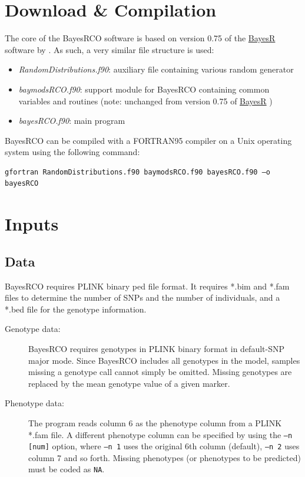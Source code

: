\documentclass{ol-softwaremanual}
\begin{document}
\section{Download \& Compilation}

The core of the BayesRCO software is based on version 0.75 of the \href{https://github.com/syntheke/bayesR/tree/master/old}{BayesR} software by \citet{moser_simultaneous_2015}. As such, a very similar file structure is used: \\
\begin{itemize}
    \item {\it RandomDistributions.f90}: auxiliary file containing various random generator %
 \item {\it baymodsRCO.f90}: support module for BayesRCO containing common variables and routines (note: unchanged from version 0.75 of \href{https://github.com/syntheke/bayesR/tree/master/old}{BayesR} 
)
\item {\it bayesRCO.f90}: main program 
\end{itemize}
BayesRCO can be compiled with a FORTRAN95 compiler on a Unix operating system using the following command:
\noindent\begin{verbatim}
gfortran RandomDistributions.f90 baymodsRCO.f90 bayesRCO.f90 –o bayesRCO
\end{verbatim}

\section{Inputs}

\subsection{Data}

BayesRCO requires PLINK binary ped file format. It requires *.bim and *.fam files to determine the number of SNPs and the number of individuals, and a *.bed file for the genotype information.  
\begin{description}
\item[Genotype data:] BayesRCO requires genotypes in PLINK binary format in default-SNP major mode. Since BayesRCO includes all genotypes in the model, samples missing a genotype call cannot simply be omitted. Missing genotypes are replaced by the mean genotype value of a given marker.
\item[Phenotype data:] The program reads column 6 as the phenotype column from a PLINK *.fam file. A different phenotype column can be specified by using the  \texttt{–n [num]} option, where \texttt{–n 1} uses the original 6th column (default), \texttt{–n 2} uses column 7 and so forth. Missing phenotypes (or phenotypes to be predicted) must be coded as \texttt{NA}.
\end{description}
\end{document}
